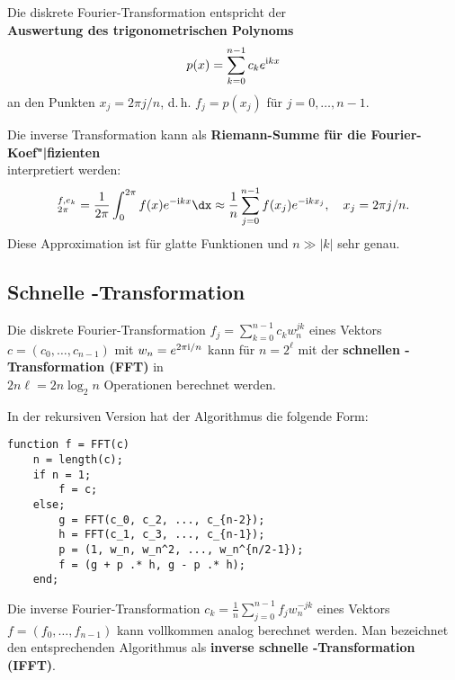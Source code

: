 \linie

Die diskrete Fourier-Transformation entspricht der \\
\textbf{Auswertung des trigonometrischen Polynoms}
\begin{align*}
    p(x) = \sum_{k=0}^{n-1} c_k e^{\mathrm{i} k x}
\end{align*}
an den Punkten $x_j = 2 \pi j / n$, d.\,h. $f_j = p(x_j)$ für
$j = 0, \dotsc, n - 1$.

\linie

Die inverse Transformation kann als
\textbf{Riemann-Summe für die Fourier-Koef"|fizienten} \\
interpretiert werden:
\begin{align*}
    \sp{f, e_k}_{2\pi} = \frac{1}{2\pi} \int_0^{2\pi} f(x) e^{-\i k x} \dx
    \approx \frac{1}{n} \sum_{j=0}^{n-1} f(x_j) e^{-\i k x_j}, \quad
    x_j = 2 \pi j / n.
\end{align*}
Diese Approximation ist für glatte Funktionen und $n \gg |k|$ sehr genau.

\subsection{%
    Schnelle -Transformation%
}

Die diskrete Fourier-Transformation $f_j = \sum_{k=0}^{n-1} c_k w_n^{jk}$
eines Vektors $c = (c_0, \dotsc, c_{n-1})$ mit $w_n = e^{2\pi\mathrm{i}/n}$
kann für $n = 2^\ell$ mit der
\textbf{schnellen -Transformation (FFT)} in \\
$2n\ell = 2 n \log_2 n$ Operationen berechnet werden.

In der rekursiven Version hat der Algorithmus die folgende Form:
\begin{lstlisting}
function f = FFT(c)
    n = length(c);
    if n = 1;
        f = c;
    else;
        g = FFT(c_0, c_2, ..., c_{n-2});
        h = FFT(c_1, c_3, ..., c_{n-1});
        p = (1, w_n, w_n^2, ..., w_n^{n/2-1});
        f = (g + p .* h, g - p .* h);
    end;
\end{lstlisting}

\linie
\pagebreak

Die inverse Fourier-Transformation
$c_k = \frac{1}{n} \sum_{j=0}^{n-1} f_j w_n^{-jk}$
eines Vektors $f = (f_0, \dotsc, f_{n-1})$
kann vollkommen analog berechnet werden.
Man bezeichnet den entsprechenden Algorithmus als
\textbf{inverse schnelle -Transformation (IFFT)}.

\linie

